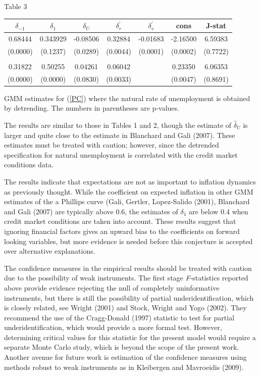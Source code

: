 \documentclass{article}
\begin{document}
\begin{center}
{\Large Table 3}

\medskip

\begin{tabular}{||c|c|c|c|c|c|c||}
\hline\hline
$\delta _{-1}$ & $\delta _{1}$ & $\delta _{U}$ & $\delta _{r}^{\prime }$ & $%
\delta _{v}^{\prime }$ & cons & J-stat \\ \hline
0.68444 & 0.343929 & -0.08506 & 0.32884 & -0.01683 & -2.16500 & 6.59383 \\
\hline
(0.0000) & (0.1237) & (0.0289) & (0.0044) & (0.0001) & (0.0002) & (0.7722)
\\ \hline
&  &  &  &  &  & \\ \hline
0.31822 & 0.50255 & 0.04261 & 0.06042 &  & 0.23350 & 6.06353 \\ \hline
(0.0000) & (0.0000) & (0.0830) & (0.0033) &  & (0.0047) & (0.8691) \\
\hline\hline
\end{tabular}%
\medskip

{\small GMM estimates for (\ref{PC}) where the natural rate of unemployment
is obtained by detrending. The numbers in parentheses are p-values.}%
\medskip
\end{center}

The results are similar to those in Tables 1 and 2, though the estimate of $%
\widehat{\delta }_{U}$ is larger and quite close to the estimate in
Blanchard and Gali (2007). These estimates must be treated with caution;
however, since the detrended specification for natural unemployment is
correlated with the credit market conditions data.

The results indicate that expectations are not as important to inflation
dynamics as previously thought. While the coefficient on expected
inflation in other GMM estimates of the a Phillips curve (Gali, Gertler,
Lopez-Salido (2001), Blanchard and Gali (2007) are typically above 0.6, the
estimates of $\delta _{1}$ are below 0.4 when credit market conditions are
taken into account. These results suggest that ignoring financial factors
gives an upward bias to the coefficients on forward looking variables, but
more evidence is needed before this conjecture is accepted over alternative
explanations.

The confidence measures in the empirical results should be treated with
caution due to the possibility of weak instruments. The first stage
\textit{F}-statistics reported above provide evidence rejecting the null of
completely uninformative instruments, but there is still the possibility of
partial underidentification, which is closely related, see Wright (2001) and
Stock, Wright and Yogo (2002). They recommend the use of the Cragg-Donald
(1997) statistic to test for partial underidentification, which would
provide a more formal test. However, determining critical values for this
statistic for the present model would require a separate Monte Carlo study,
which is beyond the scope of the present work. Another avenue for future
work is estimation of the confidence measures using methods robust to weak
instruments as in Kleibergen and Mavroeidis (2009).
\end{document}
